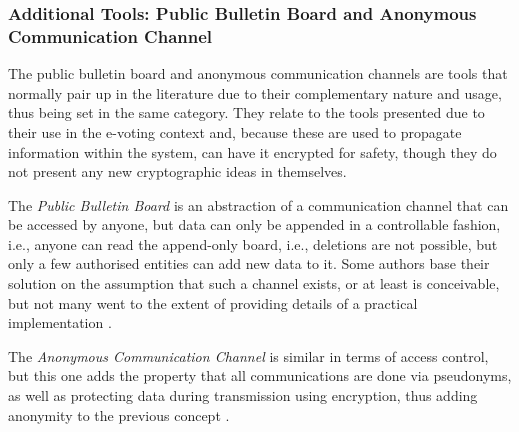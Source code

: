 \documentclass[../access.tex]{subfiles}
\begin{document}
        
        \subsubsection{Additional Tools: Public Bulletin Board and Anonymous Communication Channel}
            The public bulletin board and anonymous communication channels are tools that normally pair up in the literature due to their complementary nature and usage, thus being set in the same category. They relate to the tools presented due to their use in the e-voting context and, because these are used to propagate information within the system, can have it encrypted for safety, though they do not present any new cryptographic ideas in themselves.
            \par
            The \textit{Public Bulletin Board} is an abstraction of a communication channel that can be accessed by anyone, but data can only be appended in a controllable fashion, i.e., anyone can read the append-only board, i.e., deletions are not possible, but only a few authorised entities can add new data to it. Some authors base their solution on the assumption that such a channel exists, or at least is conceivable, but not many went to the extent of providing details of a practical implementation \cite{Juels2010}.
            \par
            The \textit{Anonymous Communication Channel} is similar in terms of access control, but this one adds the property that all communications are done via pseudonyms, as well as protecting data during transmission using encryption, thus adding anonymity to the previous concept \cite{Park1994}.
\end{document}
